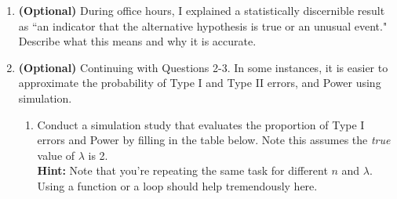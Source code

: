 \documentclass{article}\usepackage[]{graphicx}\usepackage[]{xcolor}
\begin{document}
\begin{enumerate}
\begin{enumerate}
\textcolor{red}{The proportion of Pearson Clopper intervals that capture the true proportion is 1, while the Wilson intervals is 0.9362.}
    
    \item What do parts (a)-(d) tell us about when to use each approach?
    
    \textcolor{red}{From testing the types of intervals at varying sample sizes and proportions, we find that the Wilson interval is more consistently achieving the desired alpha and capturing the true population proportion. We find that the Pearson Clopper interval is often too wide and doesn't achieve the desired alpha, especially at smaller sample sizes.}
    
  \end{enumerate}
  \item \textbf{(Optional)} During office hours, I explained a statistically 
  discernible result as ``an indicator that the alternative hypothesis is true
  or an unusual event." Describe what this means and why it is accurate.
  \item \textbf{(Optional)} Continuing with Questions 2-3.
  In some instances, it is easier to approximate the 
  probability of Type I and Type II errors, and Power using simulation. 
  \begin{enumerate}
    \item Conduct a simulation study that evaluates the proportion of Type I 
    errors and Power by filling in the table below. Note this assumes the 
    \emph{true} value of $\lambda$ is 2.\\
    \textbf{Hint:} Note that you're repeating the same task for different $n$ and
    $\lambda$. Using a function or a loop should help tremendously here.
    \begin{table}[H]
      \centering
      \begin{tabular}{llcc}\hline

\end{tabular}
\end{table}
\end{enumerate}
\end{enumerate}
\end{document}
